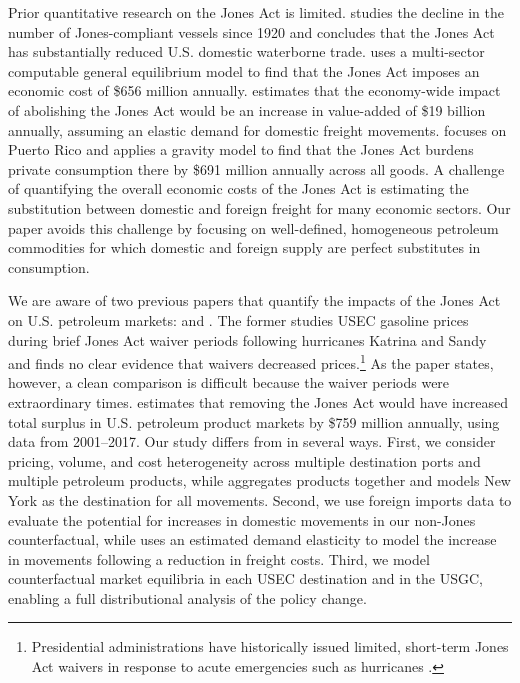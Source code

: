 \documentclass[12pt]{article}
\begin{document}
Prior quantitative research on the Jones Act is limited. \cite{olney2020} studies the decline in the number of Jones-compliant vessels since 1920 and concludes that the Jones Act has substantially reduced U.S. domestic waterborne trade. \cite{USITC2002} uses a multi-sector computable general equilibrium model to find that the Jones Act imposes an economic cost of \$656 million annually. \cite{OECD2019} estimates that the economy-wide impact of abolishing the Jones Act would be an increase in value-added of \$19 billion annually, assuming an elastic demand for domestic freight movements. \cite{hillberryjimenez2022} focuses on Puerto Rico and applies a gravity model to find that the Jones Act burdens private consumption there by \$691 million annually across all goods. A challenge of quantifying the overall economic costs of the Jones Act is estimating the substitution between domestic and foreign freight for many economic sectors. Our paper avoids this challenge by focusing on well-defined, homogeneous petroleum commodities for which domestic and foreign supply are perfect substitutes in consumption. 

We are aware of two previous papers that quantify the impacts of the Jones Act on U.S. petroleum markets: \cite{gius2013} and \cite{hernandezetal_2019}. The former studies USEC gasoline prices during brief Jones Act waiver periods following hurricanes Katrina and Sandy and finds no clear evidence that waivers decreased prices.\footnote{Presidential administrations have historically issued limited, short-term Jones Act waivers in response to acute emergencies such as hurricanes \citep{bloomberg2017,politico2022}.} As the paper states, however, a clean comparison is difficult because the waiver periods were extraordinary times. \cite{hernandezetal_2019} estimates that removing the Jones Act would have increased total surplus in U.S. petroleum product markets by \$759 million annually, using data from 2001--2017. Our study differs from \cite{hernandezetal_2019} in several ways. First, we consider pricing, volume, and cost heterogeneity across multiple destination ports and multiple petroleum products, while \cite{hernandezetal_2019} aggregates products together and models New York as the destination for all movements. Second, we use foreign imports data to evaluate the potential for increases in domestic movements in our non-Jones counterfactual, while \cite{hernandezetal_2019} uses an estimated demand elasticity to model the increase in movements following a reduction in freight costs. Third, we model counterfactual market equilibria in each USEC destination and in the USGC, enabling a full distributional analysis of the policy change.
\end{document}
